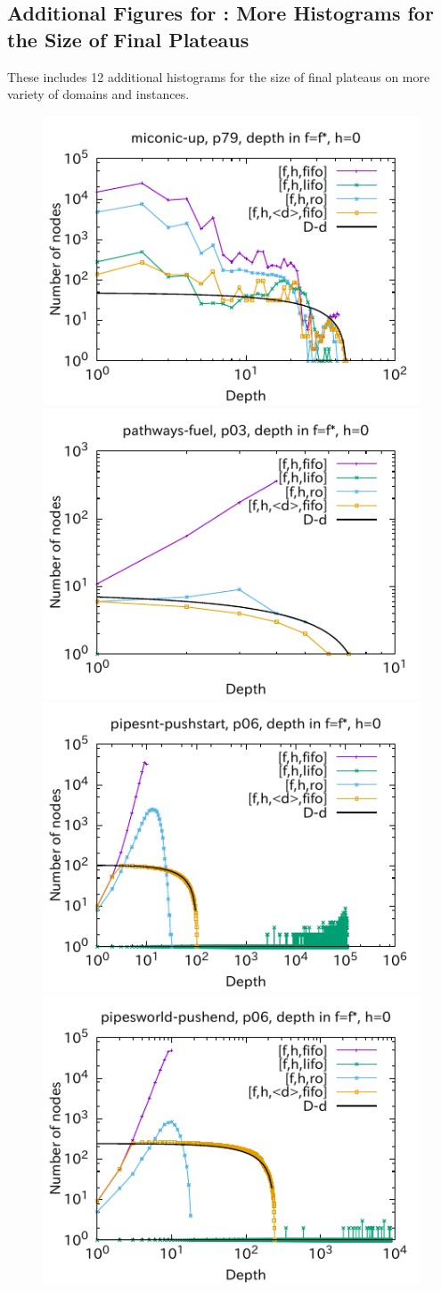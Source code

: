 \clearpage
\subsection{Additional Figures for : More Histograms for the Size of Final Plateaus}

These includes 12 additional histograms for the size of final plateaus on
more variety of domains and instances.

\begin{figure}[htbp]
\includegraphics[width=0.49\linewidth]{img/output-lmcut/miconic-up/p79-0.pdf}
\includegraphics[width=0.49\linewidth]{img/output-lmcut/pathways-fuel/p03-0.pdf}
\includegraphics[width=0.49\linewidth]{img/output-lmcut/pipesnt-pushstart/p06-0.pdf}
\includegraphics[width=0.49\linewidth]{img/output-lmcut/pipesworld-pushend/p06-0.pdf}

\end{figure}
